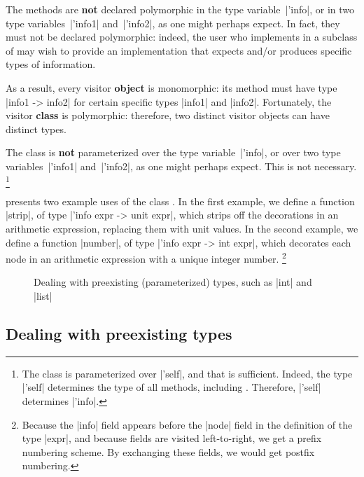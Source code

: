 \documentclass[onecolumn,11pt,nocopyrightspace]{sigplanconf}
\renewcommand{\emph}[1]{\textbf{#1}}
\begin{document}
The methods are \emph{not} declared polymorphic in the type
variable~\oc|'info|, or in two type variables~\oc|'info1| and~\oc|'info2|, as
one might perhaps expect. In fact, they must not be declared polymorphic:
indeed, the user who implements  in a subclass of \map may
wish to provide an implementation that expects and/or produces specific types
of information.

As a result, every visitor \emph{object} is monomorphic: its method
 must have type \oc|info1 -> info2| for certain specific
types \oc|info1| and \oc|info2|. Fortunately, the visitor \emph{class} is
polymorphic: therefore, two distinct visitor objects can have distinct types.

The class \map is \emph{not} parameterized over the type variable~\oc|'info|,
or over two type variables~\oc|'info1| and~\oc|'info2|, as one might perhaps
expect. This is not necessary.%
\footnote{The class is parameterized over \oc|'self|, and that is sufficient.
  Indeed, the type \oc|'self| determines the type of all methods, including
  . Therefore, \oc|'self| determines \oc|'info|.}

 presents two example uses of the class \map. In the first
example, we define a function \oc|strip|, of type \oc|'info expr -> unit expr|,
which strips off the decorations in an arithmetic expression, replacing them
with unit values. In the second example, we define a function \oc|number|,
of type \oc|'info expr -> int expr|, which decorates each node in an arithmetic
expression with a unique integer number.%
\footnote{Because the \oc|info| field appears before the \oc|node| field in
  the definition of the type \oc|expr|, and because fields are visited
  left-to-right, we get a prefix numbering scheme. By exchanging these fields,
  we would get postfix numbering.}


\begin{figure}[t]
\vspace{-\baselineskip}
\caption{Dealing with preexisting (parameterized) types, such as \oc|int| and \oc|list|}
\label{fig:expr11}
\end{figure}

\subsection{Dealing with preexisting types}
\label{sec:intro:nonlocal}
\end{document}
